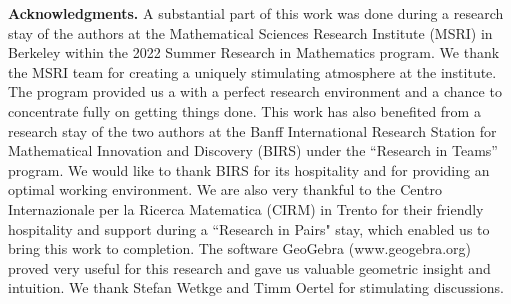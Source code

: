 \documentclass[reqno]{amsart}
\begin{document}




\par{\bf Acknowledgments.} A substantial part of this work was done
during a research stay of the authors at the Mathematical Sciences
Research Institute (MSRI) in Berkeley within the 2022 Summer Research
in Mathematics program. We thank the MSRI team for creating a uniquely
stimulating atmosphere at the institute. The program provided us a
with a perfect research environment and a chance to concentrate fully
on getting things done.  This work has also benefited from a research
stay of the two authors at the Banff International Research Station
for Mathematical Innovation and Discovery (BIRS) under the ``Research
in Teams'' program. We would like to thank BIRS for its hospitality
and for providing an optimal working environment. 
We are also very thankful to the 
Centro Internazionale per la Ricerca Matematica
(CIRM) in Trento for their friendly hospitality and support during a ``Research in Pairs" stay, which enabled us to bring this work to completion.
The software GeoGebra (www.geogebra.org) proved very useful for this research and gave us valuable geometric insight and intuition.
We thank Stefan
Wetkge and Timm Oertel for stimulating discussions.
\end{document}
